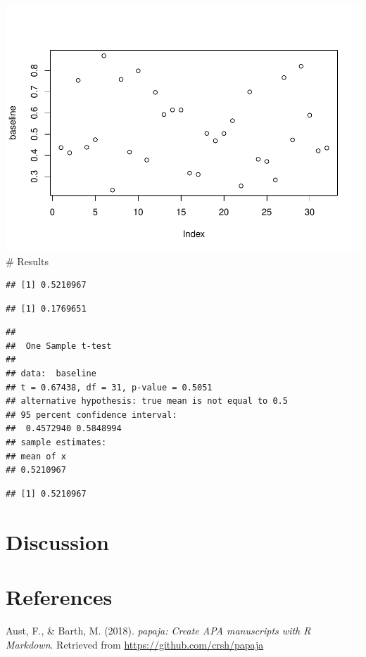 \documentclass[man]{apa6}
\begin{document}
\includegraphics{Midterm_files/figure-latex/unnamed-chunk-5-1.pdf} \#
Results

\begin{verbatim}
## [1] 0.5210967
\end{verbatim}

\begin{verbatim}
## [1] 0.1769651
\end{verbatim}

\begin{verbatim}
## 
##  One Sample t-test
## 
## data:  baseline
## t = 0.67438, df = 31, p-value = 0.5051
## alternative hypothesis: true mean is not equal to 0.5
## 95 percent confidence interval:
##  0.4572940 0.5848994
## sample estimates:
## mean of x 
## 0.5210967
\end{verbatim}

\begin{verbatim}
## [1] 0.5210967
\end{verbatim}

\section{Discussion}\label{discussion}

\newpage

\section{References}\label{references}

\begingroup
\setlength{\parindent}{-0.5in} \setlength{\leftskip}{0.5in}

\hypertarget{refs}{}
\hypertarget{ref-R-papaja}{}
Aust, F., \& Barth, M. (2018). \emph{papaja: Create APA manuscripts with
R Markdown}. Retrieved from \url{https://github.com/crsh/papaja}
\end{document}

